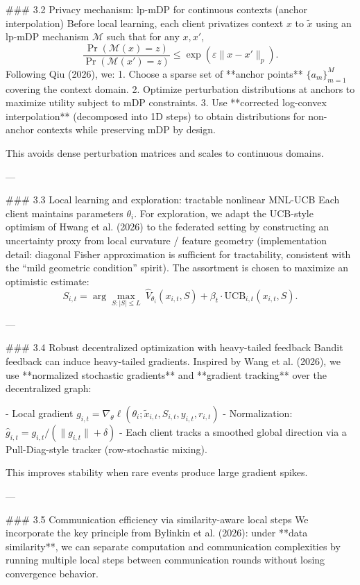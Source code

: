 ### 3.2 Privacy mechanism: lp-mDP for continuous contexts (anchor interpolation)  
Before local learning, each client privatizes context \(x\) to \(\tilde x\) using an lp-mDP mechanism \(\mathcal{M}\) such that for any \(x,x'\),
\[
\frac{\Pr(\mathcal{M}(x)=z)}{\Pr(\mathcal{M}(x')=z)} \le \exp(\varepsilon \|x-x'\|_p).
\]
Following Qiu (2026), we:
1. Choose a sparse set of **anchor points** \(\{a_m\}_{m=1}^M\) covering the context domain.
2. Optimize perturbation distributions at anchors to maximize utility subject to mDP constraints.
3. Use **corrected log-convex interpolation** (decomposed into 1D steps) to obtain distributions for non-anchor contexts while preserving mDP by design.

This avoids dense perturbation matrices and scales to continuous domains.

---

### 3.3 Local learning and exploration: tractable nonlinear MNL-UCB  
Each client maintains parameters \(\theta_i\). For exploration, we adapt the UCB-style optimism of Hwang et al. (2026) to the federated setting by constructing an uncertainty proxy from local curvature / feature geometry (implementation detail: diagonal Fisher approximation is sufficient for tractability, consistent with the “mild geometric condition” spirit). The assortment is chosen to maximize an optimistic estimate:
\[
S_{i,t} = \arg\max_{S:|S|\le L} \ \hat{V}_{\theta_i}(x_{i,t},S) + \beta_t \cdot \mathrm{UCB}_{i,t}(x_{i,t},S).
\]

---

### 3.4 Robust decentralized optimization with heavy-tailed feedback  
Bandit feedback can induce heavy-tailed gradients. Inspired by Wang et al. (2026), we use **normalized stochastic gradients** and **gradient tracking** over the decentralized graph:

- Local gradient \(g_{i,t} = \nabla_\theta \ell(\theta_i; \tilde x_{i,t}, S_{i,t}, y_{i,t}, r_{i,t})\)
- Normalization: \(\hat g_{i,t} = g_{i,t}/(\|g_{i,t}\|+\delta)\)
- Each client tracks a smoothed global direction via a Pull-Diag-style tracker (row-stochastic mixing).

This improves stability when rare events produce large gradient spikes.

---

### 3.5 Communication efficiency via similarity-aware local steps  
We incorporate the key principle from Bylinkin et al. (2026): under **data similarity**, we can separate computation and communication complexities by running multiple local steps between communication rounds without losing convergence behavior.

